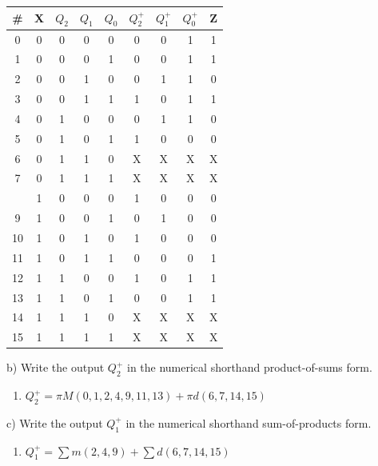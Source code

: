 \documentclass{article}
\begin{document}
    \begin{center}
        \begin{tabular} {c|c|ccc|ccc|c}
            \# & X & $Q_2$ & $Q_1$ & $Q_0$ & $Q_2^+$ & $Q_1^+$ & $Q_0^+$ & Z \\
            \hline
            0 & 0 & 0 & 0 & 0 & 0 & 0 & 1 & 1 \\
            1 & 0 & 0 & 0 & 1 & 0 & 0 & 1 & 1 \\
            2 & 0 & 0 & 1 & 0 & 0 & 1 & 1 & 0 \\
            3 & 0 & 0 & 1 & 1 & 1 & 0 & 1 & 1 \\
            4 & 0 & 1 & 0 & 0 & 0 & 1 & 1 & 0 \\
            5 & 0 & 1 & 0 & 1 & 1 & 0 & 0 & 0 \\
            6 & 0 & 1 & 1 & 0 & X & X & X & X \\
            7 & 0 & 1 & 1 & 1 & X & X & X & X \\
            \hdashline
            8 & 1 & 0 & 0 & 0 & 1 & 0 & 0 & 0 \\
            9 & 1 & 0 & 0 & 1 & 0 & 1 & 0 & 0 \\
            10 & 1 & 0 & 1 & 0 & 1 & 0 & 0 & 0 \\
            11 & 1 & 0 & 1 & 1 & 0 & 0 & 0 & 1 \\
            12 & 1 & 1 & 0 & 0 & 1 & 0 & 1 & 1 \\
            13 & 1 & 1 & 0 & 1 & 0 & 0 & 1 & 1 \\
            14 & 1 & 1 & 1 & 0 & X & X & X & X \\
            15 & 1 & 1 & 1 & 1 & X & X & X & X \\
        \end{tabular}
    \end{center}

    b) Write the output $Q_2^+$ in the numerical shorthand product-of-sums form.

    \begin{enumerate}[label=\textbf{Solution:}, leftmargin=*]
        \item 
        $Q_2^+=\pi M(0,1,2,4,9,11,13) + \pi d(6,7,14,15)$
    \end{enumerate}

    c) Write the output $Q_1^+$ in the numerical shorthand sum-of-products form.

    \begin{enumerate}[label=\textbf{Solution:}, leftmargin=*]
        \item 
        $Q_1^+=\sum m(2,4,9) + \sum d(6,7,14,15)$
    \end{enumerate}
\end{document}
